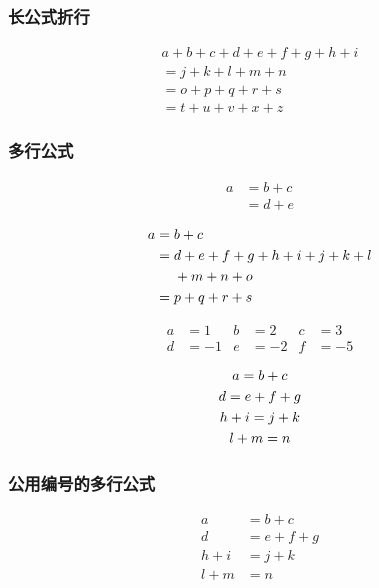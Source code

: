 \documentclass[12pt,UTF8]{ctexart}%
\begin{document}
\subsubsection{长公式折行}

\begin{multline}
a + b + c + d + e + f
+ g + h + i \\
= j + k + l + m + n\\
= o + p + q + r + s\\
= t + u + v + x + z
\end{multline}


\subsubsection{多行公式}

\begin{align}
a & = b + c \\
& = d + e
\end{align}


\begin{align}
a ={} & b + c \\
={} & d + e + f + g + h + i
+ j + k + l \notag \\
& + m + n + o \\
={} & p + q + r + s
\end{align}

\begin{align}
a &=1 & b &=2 & c &=3 \\
d &=-1 & e &=-2 & f &=-5
\end{align}

\begin{gather}
a = b + c \\
d = e + f + g \\
h + i = j + k \notag \\
l + m = n
\end{gather}


\subsubsection{公用编号的多行公式}

\begin{equation}
\begin{aligned}
a &= b + c \\
d &= e + f + g \\
h + i &= j + k \\
l + m &= n
\end{aligned}
\end{equation}
\end{document}
